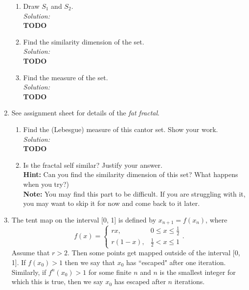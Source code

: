 \documentclass[10pt]{amsart}
\theoremstyle{nonumberplain}
\begin{document}
\begin{enumerate}[label={\bf {\arabic*}:}]
\begin{enumerate}
\item Draw $S_1$ and $S_2$. \\

\textit{Solution:} \\
\textbf{TODO} \\

\item Find the similarity dimension of the set. \\

\textit{Solution:} \\
\textbf{TODO} \\

\item Find the measure of the set. \\

\textit{Solution:} \\
\textbf{TODO} \\

\end{enumerate}

\newpage

\item See assignment sheet for details of the \textit{fat fractal}. \\

\begin{enumerate}
\item Find the (Lebesgue) measure of this cantor set. Show your work. \\

\textit{Solution:} \\
\textbf{TODO} \\

\item Is the fractal self similar?
Justify your answer. \\
\textbf{Hint:} Can you find the similarity dimension of this set?
What happens when you try?) \\
\textbf{Note:} You may find this part to be difficult.
If you are struggling with it, you may want to skip it for now and come back to it later. 
\\
\end{enumerate}
 
 \newpage
 
\item The tent map on the interval [0, 1] is defined by $x_{n + 1} = f(x_n)$, where 
$$
f(x) = \begin{cases}
rx,  &0 \leq x \leq \frac 1 2 \\
r(1 - x), &\frac 1 2 < x \leq 1
\end{cases}.
$$
Assume that $r > 2$.
Then some points get mapped outside of the interval [0, 1].
If $f(x_0) > 1$ then we say that $x_0$ has ``escaped" after one iteration.
Similarly, if $f^n(x_0) > 1$ for some finite $n$ and $n$ is the smallest integer for which this is true, then we say $x_0$ has escaped after $n$ iterations.


\end{enumerate}
\end{document}
